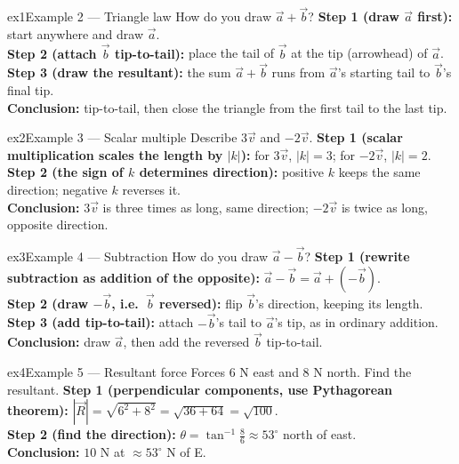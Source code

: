 \documentclass[11pt]{article}
\begin{document}
\begin{example}{ex1}{Example 2 --- Triangle law}
How do you draw $\vec a+\vec b$?\soln
\textbf{Step 1 (draw $\vec a$ first):} start anywhere and draw $\vec a$.\\[3pt]
\textbf{Step 2 (attach $\vec b$ tip-to-tail):} place the tail of $\vec b$ at the tip (arrowhead) of $\vec a$.\\[3pt]
\textbf{Step 3 (draw the resultant):} the sum $\vec a+\vec b$ runs from $\vec a$'s starting tail to $\vec b$'s final tip.\\[3pt]
\textbf{Conclusion:} tip-to-tail, then close the triangle from the first tail to the last tip.
\end{example}

\begin{example}{ex2}{Example 3 --- Scalar multiple}
Describe $3\vec v$ and $-2\vec v$.\soln
\textbf{Step 1 (scalar multiplication scales the length by $|k|$):} for $3\vec v$, $|k|=3$; for $-2\vec v$, $|k|=2$.\\[3pt]
\textbf{Step 2 (the sign of $k$ determines direction):} positive $k$ keeps the same direction; negative $k$ reverses it.\\[3pt]
\textbf{Conclusion:} $3\vec v$ is three times as long, same direction; $-2\vec v$ is twice as long, opposite direction.
\end{example}

\begin{example}{ex3}{Example 4 --- Subtraction}
How do you draw $\vec a-\vec b$?\soln
\textbf{Step 1 (rewrite subtraction as addition of the opposite):} $\vec a-\vec b=\vec a+(-\vec b)$.\\[3pt]
\textbf{Step 2 (draw $-\vec b$, i.e.\ $\vec b$ reversed):} flip $\vec b$'s direction, keeping its length.\\[3pt]
\textbf{Step 3 (add tip-to-tail):} attach $-\vec b$'s tail to $\vec a$'s tip, as in ordinary addition.\\[3pt]
\textbf{Conclusion:} draw $\vec a$, then add the reversed $\vec b$ tip-to-tail.
\end{example}

\begin{example}{ex4}{Example 5 --- Resultant force}
Forces 6 N east and 8 N north. Find the resultant.\soln
\textbf{Step 1 (perpendicular components, use Pythagorean theorem):} $|\vec R|=\sqrt{6^2+8^2}=\sqrt{36+64}=\sqrt{100}$.\\[3pt]
\textbf{Step 2 (find the direction):} $\theta=\tan^{-1}\tfrac86\approx53^\circ$ north of east.\\[3pt]
\textbf{Conclusion:} $10$ N at $\approx53^\circ$ N of E.
\end{example}
\end{document}
